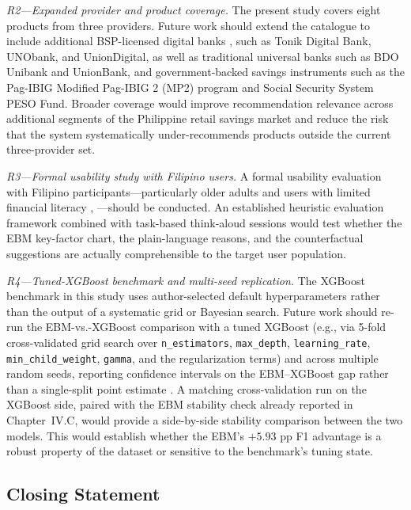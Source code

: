 \documentclass[journal]{./IEEE/IEEEtran}
\begin{document}
\textit{R2---Expanded provider and product coverage.} The present study covers eight products from three providers. Future work should extend the catalogue to include additional BSP-licensed digital banks \cite{ref36}, \cite{ref38} such as Tonik Digital Bank, UNObank, and UnionDigital, as well as traditional universal banks such as BDO Unibank and UnionBank, and government-backed savings instruments such as the Pag-IBIG Modified Pag-IBIG 2 (MP2) program and Social Security System PESO Fund. Broader coverage would improve recommendation relevance across additional segments of the Philippine retail savings market and reduce the risk that the system systematically under-recommends products outside the current three-provider set.

\textit{R3---Formal usability study with Filipino users.} A formal usability evaluation with Filipino participants---particularly older adults and users with limited financial literacy \cite{ref43}, \cite{ref76}---should be conducted. An established heuristic evaluation framework \cite{ref28} combined with task-based think-aloud sessions would test whether the EBM key-factor chart, the plain-language reasons, and the counterfactual suggestions are actually comprehensible to the target user population.

\textit{R4---Tuned-XGBoost benchmark and multi-seed replication.} The XGBoost benchmark in this study uses author-selected default hyperparameters rather than the output of a systematic grid or Bayesian search. Future work should re-run the EBM-vs.-XGBoost comparison with a tuned XGBoost (e.g., via 5-fold cross-validated grid search over \texttt{n\_estimators}, \texttt{max\_depth}, \texttt{learning\_rate}, \texttt{min\_child\_weight}, \texttt{gamma}, and the regularization terms) and across multiple random seeds, reporting confidence intervals on the EBM--XGBoost gap rather than a single-split point estimate \cite{ref68}. A matching cross-validation run on the XGBoost side, paired with the EBM stability check already reported in Chapter~IV.C, would provide a side-by-side stability comparison between the two models. This would establish whether the EBM's $+5.93$ pp F1 advantage is a robust property of the dataset or sensitive to the benchmark's tuning state.

\subsection{Closing Statement}
\end{document}
